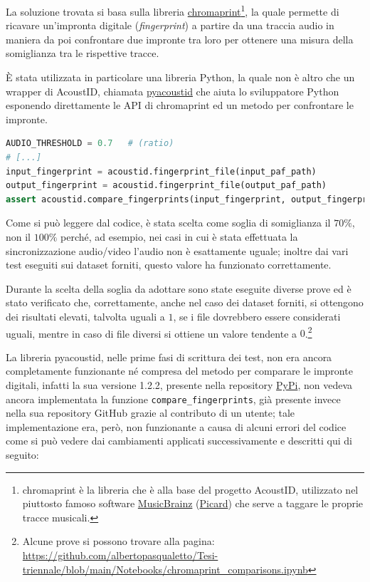La soluzione trovata si basa sulla libreria \href{https://acoustid.org/chromaprint}{chromaprint}\footnote{chromaprint è la libreria che è alla base del progetto AcoustID, utilizzato nel piuttosto famoso software \href{https://musicbrainz.org/}{MusicBrainz} (\href{https://picard.musicbrainz.org/}{Picard}) che serve a taggare le proprie tracce musicali.}, la quale permette di ricavare un'impronta digitale (\textit{fingerprint}) a partire da una traccia audio in maniera da poi confrontare due impronte tra loro per ottenere una misura della somiglianza tra le rispettive tracce.    %

È stata utilizzata in particolare una libreria Python, la quale non è altro che un wrapper di AcoustID, chiamata \href{https://github.com/beetbox/pyacoustid}{pyacoustid} che aiuta lo sviluppatore Python esponendo direttamente le API di chromaprint ed un metodo per confrontare le impronte.

\begin{lstlisting}[language=Python, caption=Test di comparazione di due file audio tramite la loro impronta digitale]
AUDIO_THRESHOLD = 0.7   # (ratio)
# [...]
input_fingerprint = acoustid.fingerprint_file(input_paf_path)
output_fingerprint = acoustid.fingerprint_file(output_paf_path)
assert acoustid.compare_fingerprints(input_fingerprint, output_fingerprint) > AUDIO_THRESHOLD, "PreservationAudioFile.wav is not the same as input"
\end{lstlisting}

Come si può leggere dal codice, è stata scelta come soglia di somiglianza il $70\%$, non il $100\%$ perché, ad esempio, nei casi in cui è stata effettuata la sincronizzazione audio/video l'audio non è esattamente uguale; inoltre dai vari test eseguiti sui dataset forniti, questo valore ha funzionato correttamente.

Durante la scelta della soglia da adottare sono state eseguite diverse prove ed è stato verificato che, correttamente, anche nel caso dei dataset forniti, si ottengono dei risultati elevati, talvolta uguali a $1$, se i file dovrebbero essere considerati uguali, mentre in caso di file diversi si ottiene un valore tendente a $0$.\footnote{Alcune prove si possono trovare alla pagina: \url{https://github.com/albertopasqualetto/Tesi-triennale/blob/main/Notebooks/chromaprint_comparisons.ipynb}}   %

La libreria pyacoustid, nelle prime fasi di scrittura dei test, non era ancora completamente funzionante né compresa del metodo per comparare le impronte digitali, infatti la sua versione 1.2.2, presente nella repository \href{https://pypi.org/}{PyPi}, non vedeva ancora implementata la funzione \verb|compare_fingerprints|, già presente invece nella sua repository GitHub grazie al contributo di un utente; tale implementazione era, però, non funzionante a causa di alcuni errori del codice come si può vedere dai cambiamenti applicati successivamente e descritti qui di seguito: 

